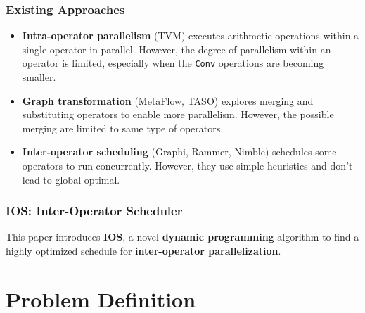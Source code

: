 \documentclass[12pt,aspectratio=169]{beamer}
\begin{document}
    \begin{frame}
        \frametitle{Existing Approaches}

        \begin{itemize}
            \setlength{\itemsep}{.8em}
            \item \textbf{Intra-operator parallelism} (TVM) executes arithmetic operations within a single operator in
                  parallel. However, the degree of parallelism within an operator is limited, especially when the
                  \texttt{Conv} operations are becoming smaller.
            \item \textbf{Graph transformation} (MetaFlow, TASO) explores merging and substituting operators to enable
                  more parallelism. However, the possible merging are limited to same type of operators.
            \item \textbf{Inter-operator scheduling} (Graphi, Rammer, Nimble) schedules some operators to run
                  concurrently. However, they use simple heuristics and don't lead to global optimal.
        \end{itemize}
    \end{frame}

    \begin{frame}
        \frametitle{IOS: Inter-Operator Scheduler}

        This paper introduces \textbf{IOS}, a novel \textbf{dynamic programming} algorithm to find a highly optimized schedule
        for \textbf{inter-operator parallelization}.
    \end{frame}

    \section{Problem Definition}
\end{document}
